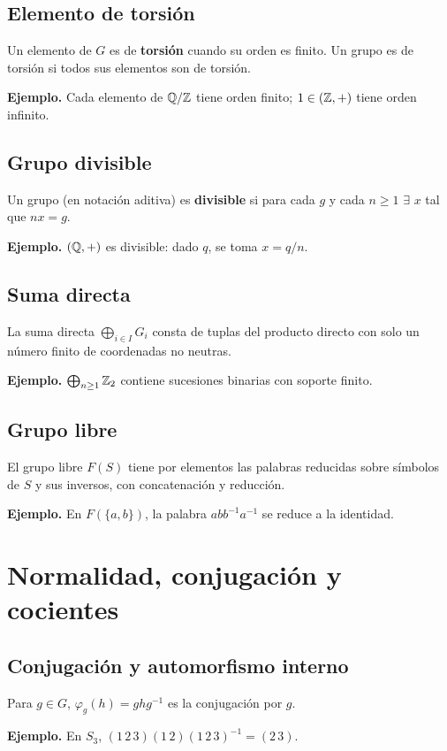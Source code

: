 \documentclass[11pt,a4paper]{article}
\begin{document}
\subsection{Elemento de torsión}
\begin{definicion}
Un elemento de $G$ es de \textbf{torsión} cuando su orden es finito. Un grupo es de torsión si todos sus elementos son de torsión.
\end{definicion}
\textbf{Ejemplo.} Cada elemento de $\mathbb{Q}/\mathbb{Z}$ tiene orden finito; $1\in(\mathbb{Z},+)$ tiene orden infinito.


\subsection{Grupo divisible}
\begin{definicion}
Un grupo (en notación aditiva) es \textbf{divisible} si para cada $g$ y cada $n\ge1$ $\exists$ $x$ tal que $nx=g$.
\end{definicion}
\textbf{Ejemplo.} $(\mathbb{Q},+)$ es divisible: dado $q$, se toma $x=q/n$.


\subsection{Suma directa}
\begin{definicion}
La suma directa $\bigoplus_{i\in I}G_i$ consta de tuplas del producto directo con solo un número finito de coordenadas no neutras.
\end{definicion}
\textbf{Ejemplo.} $\bigoplus_{n\ge1}\mathbb{Z}_2$ contiene sucesiones binarias con soporte finito.


\subsection{Grupo libre}
\begin{definicion}
El grupo libre $F(S)$ tiene por elementos las palabras reducidas sobre símbolos de $S$ y sus inversos, con concatenación y reducción.
\end{definicion}
\textbf{Ejemplo.} En $F(\{a,b\})$, la palabra $abb^{-1}a^{-1}$ se reduce a la identidad.


\section{Normalidad, conjugación y cocientes}

\subsection{Conjugación y automorfismo interno}
\begin{definicion}
Para $g\in G$, $\varphi_g(h)=ghg^{-1}$ es la conjugación por $g$.
\end{definicion}
\textbf{Ejemplo.} En $S_3$, $(1\,2\,3)(1\,2)(1\,2\,3)^{-1}=(2\,3)$.
\end{document}
